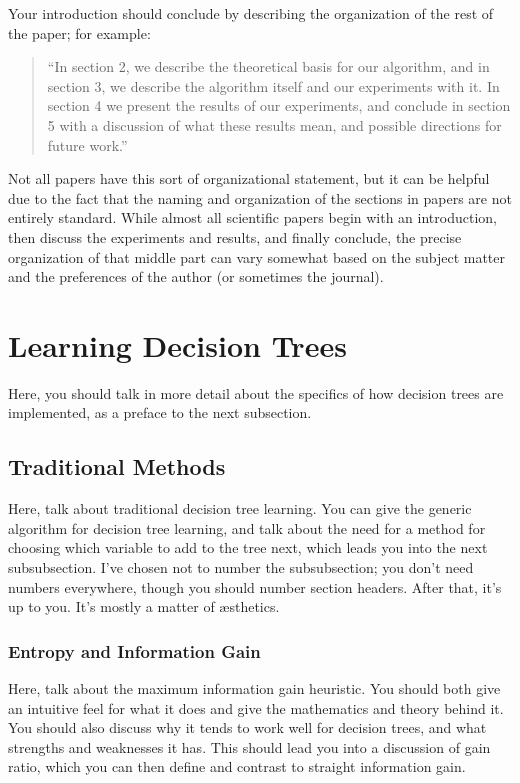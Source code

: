 \documentclass[12pt,letterpaper]{article}
\begin{document}
Your introduction should conclude by describing the organization of the rest of
the paper; for example:
\begin{quote}
``In section 2, we describe the theoretical basis for our algorithm, and in section
3, we describe the algorithm itself and our experiments with it.  In section 4
we present the results of our experiments, and conclude in section 5 with a
discussion of what these results mean, and possible directions for future
work.''
\end{quote}

Not all papers have this sort of organizational statement, but it can be helpful
due to the fact that the naming and organization of the sections in papers are
not entirely standard.  While almost all scientific papers begin with an
introduction, then discuss the experiments and results, and finally conclude,
the precise organization of that middle part can vary somewhat based on the
subject matter and the preferences of the author (or sometimes the journal).

\section{Learning Decision Trees}
Here, you should talk in more detail about the specifics of how decision trees
are implemented, as a preface to the next subsection.

\subsection{Traditional Methods}
Here, talk about traditional decision tree learning.  You can give the generic
algorithm for decision tree learning, and talk about the need for a method for
choosing which variable to add to the tree next, which leads you into the next
subsubsection.  I've chosen not to number the subsubsection; you don't need
numbers everywhere, though you should number section headers.  After that, it's
up to you.  It's mostly a matter of \ae sthetics.

\subsubsection*{Entropy and Information Gain}
Here, talk about the maximum information gain heuristic.  You should both give
an intuitive feel for what it does and give the mathematics and theory behind
it.  You should also discuss why it tends to work well for decision trees, and
what strengths and weaknesses it has.  This should lead you into a discussion of
gain ratio, which you can then define and contrast to straight information gain.
\end{document}
